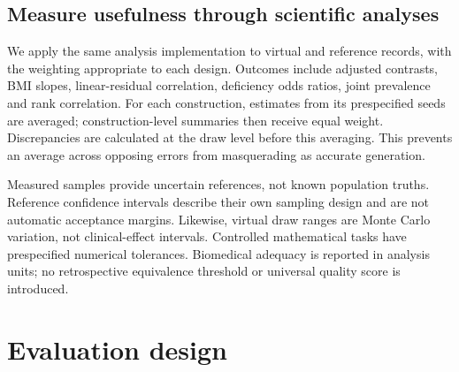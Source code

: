 \documentclass[11pt,letterpaper]{article}
\begin{document}
\FloatBarrier


\subsection{Measure usefulness through scientific analyses}

We apply the same analysis implementation to virtual and reference records, with the weighting appropriate to each design. Outcomes include adjusted contrasts, BMI slopes, linear-residual correlation, deficiency odds ratios, joint prevalence and rank correlation. For each construction, estimates from its prespecified seeds are averaged; construction-level summaries then receive equal weight. Discrepancies are calculated at the draw level before this averaging. This prevents an average across opposing errors from masquerading as accurate generation.


Measured samples provide uncertain references, not known population truths. Reference confidence intervals describe their own sampling design and are not automatic acceptance margins. Likewise, virtual draw ranges are Monte Carlo variation, not clinical-effect intervals. Controlled mathematical tasks have prespecified numerical tolerances. Biomedical adequacy is reported in analysis units; no retrospective equivalence threshold or universal quality score is introduced.



\section{Evaluation design}

\FloatBarrier

\begingroup

\small

\renewcommand{\arraystretch}{1.22}
\end{document}
